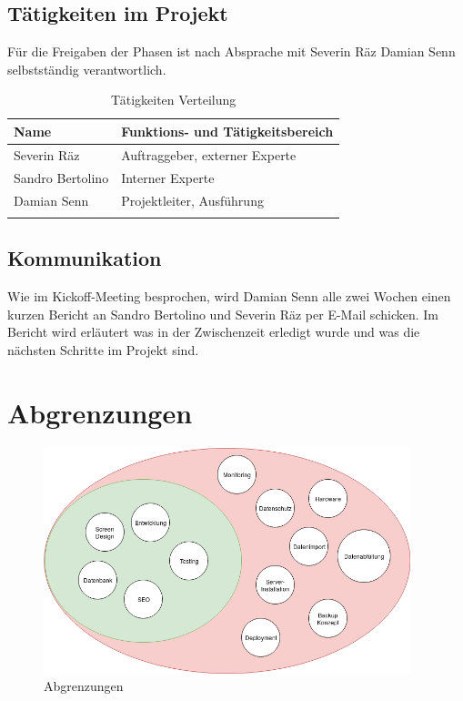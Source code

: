 \subsection{Tätigkeiten im Projekt}\label{tuxe4tigkeiten-im-projekt}

Für die Freigaben der Phasen ist nach Absprache mit Severin Räz Damian Senn
selbstständig verantwortlich.

\begin{longtable}[]{@{}ll@{}}
  \toprule
  Name             & Funktions- und Tätigkeitsbereich\tabularnewline
  \midrule
  \endhead
  Severin Räz      & Auftraggeber, externer Experte\tabularnewline
  Sandro Bertolino & Interner Experte\tabularnewline
  Damian Senn      & Projektleiter, Ausführung\tabularnewline
  \bottomrule
  \caption{Tätigkeiten Verteilung}
\end{longtable}

\subsection{Kommunikation}\label{kommunikation}

Wie im Kickoff-Meeting besprochen, wird Damian Senn alle zwei Wochen einen
kurzen Bericht an Sandro Bertolino und Severin Räz per E-Mail schicken.
Im Bericht wird erläutert was in der Zwischenzeit erledigt wurde und was
die nächsten Schritte im Projekt sind.

\clearpage

\section{Abgrenzungen}\label{abgrenzungen}

\begin{figure}[!htb]
  \centering
  \includegraphics[width=0.95\textwidth]{figures/abgrenzungen.png}
  \caption{Abgrenzungen}
\end{figure}

